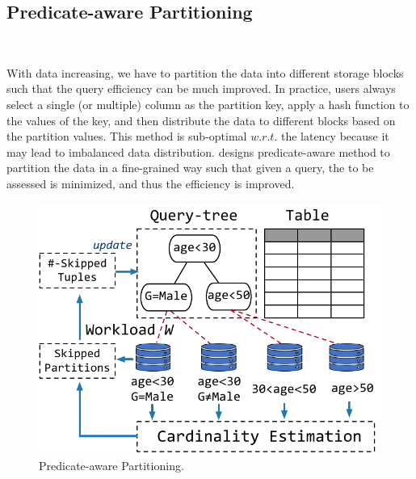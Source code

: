 






\subsection{Predicate-aware Partitioning}~\label{subsec:partition}


With  data  increasing, we  have to partition the data into different storage blocks such that the query efficiency can be much improved. In practice, users always select a single (or multiple) column as the partition key,  apply   a hash function to the values of the key, and then distribute the data to different blocks based on the partition values. This method is sub-optimal $w.r.t.$ the latency because it may lead to imbalanced data distribution. \brain  designs predicate-aware  method to partition the data in a fine-grained way such that given a query, the  to be assessed is minimized, and thus the efficiency is improved.


\begin{figure}[htbp]
	\includegraphics[scale=0.5]{figures/partition}
	\centering
	\vspace{-1em}
	\caption{Predicate-aware Partitioning.}
	\label{fig:partition}
	\vspace{-1em}
\end{figure}


